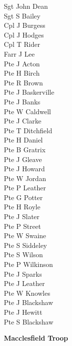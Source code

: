 \begin{multicols}{2}
  \noindent
  Sgt John Dean \\
  Sgt S Bailey \\
  Cpl J Burgess \\
  Cpl J Hodges \\
  Cpl T Rider \\
  Farr J Lee \\
  Pte J Acton \\
  Pte H Birch \\
  Pte R Brown \\
  Pte J Baskerville \\
  Pte J Banks \\
  Pte W Caldwell \\
  Pte J Clarke \\
  Pte T Ditchfield \\
  Pte H Daniel \\
  Pte B Gratrix \\
  Pte J Gleave \\
  Pte J Howard \\
  Pte W Jordan \\
  Pte P Leather \\
  Pte G Potter \\
  Pte H Royle \\
  Pte J Slater \\
  Pte P Street \\
  Pte W Swaine \\
  Pte S Siddeley \\
  Pte S Wilson \\
  Pte P Wilkinson \\
  Pte J Sparks \\
  Pte J Leather \\
  Pte W Knowles \\
  Pte J Blackshaw \\
  Pte J Hewitt \\
  Pte S Blackshaw \\
\end{multicols}

\begin{center}
  \Large
  \textbf{Macclesfield Troop}
\end{center}

